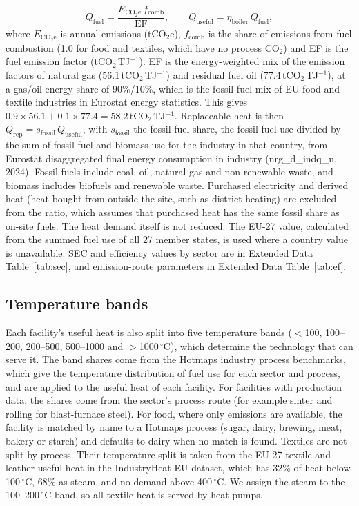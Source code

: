 \documentclass[11pt]{article}
\begin{document}
\begin{equation}
Q_{\mathrm{fuel}} = \frac{E_{\mathrm{CO_2e}}\, f_{\mathrm{comb}}}{\mathrm{EF}}, \qquad Q_{\mathrm{useful}} = \eta_{\mathrm{boiler}}\, Q_{\mathrm{fuel}},
\end{equation}
where $E_{\mathrm{CO_2e}}$ is annual emissions (tCO$_2$e), $f_{\mathrm{comb}}$ is the share of emissions from fuel combustion (1.0 for food and textiles, which have no process CO$_2$) and EF is the fuel emission factor (tCO$_2$\,TJ$^{-1}$). EF is the energy-weighted mix of the emission factors of natural gas (56.1\,tCO$_2$\,TJ$^{-1}$) and residual fuel oil (77.4\,tCO$_2$\,TJ$^{-1}$)\cite{ipcc2006stationary}, at a gas/oil energy share of 90\%/10\%, which is the fossil fuel mix of EU food and textile industries in Eurostat energy statistics\cite{eurostat_nrg_d_indq}. This gives $0.9\times56.1+0.1\times77.4=58.2$\,tCO$_2$\,TJ$^{-1}$. Replaceable heat is then $Q_{\mathrm{rep}} = s_{\mathrm{fossil}}\, Q_{\mathrm{useful}}$, with $s_{\mathrm{fossil}}$ the fossil-fuel share, the fossil fuel use divided by the sum of fossil fuel and biomass use for the industry in that country, from Eurostat disaggregated final energy consumption in industry (nrg\_d\_indq\_n, 2024)\cite{eurostat_nrg_d_indq_n}. Fossil fuels include coal, oil, natural gas and non-renewable waste, and biomass includes biofuels and renewable waste. Purchased electricity and derived heat (heat bought from outside the site, such as district heating) are excluded from the ratio, which assumes that purchased heat has the same fossil share as on-site fuels. The heat demand itself is not reduced. The EU-27 value, calculated from the summed fuel use of all 27 member states, is used where a country value is unavailable. SEC and efficiency values by sector are in Extended Data Table~\ref{tab:sec}, and emission-route parameters in Extended Data Table~\ref{tab:ef}.

\subsection*{Temperature bands}
Each facility's useful heat is also split into five temperature bands ($<$100, 100--200, 200--500, 500--1000 and $>$1000\,$^\circ$C), which determine the technology that can serve it. The band shares come from the Hotmaps industry process benchmarks\cite{hotmaps2018}, which give the temperature distribution of fuel use for each sector and process, and are applied to the useful heat of each facility. For facilities with production data, the shares come from the sector's process route (for example sinter and rolling for blast-furnace steel). For food, where only emissions are available, the facility is matched by name to a Hotmaps process (sugar, dairy, brewing, meat, bakery or starch) and defaults to dairy when no match is found. Textiles are not split by process. Their temperature split is taken from the EU-27 textile and leather useful heat in the IndustryHeat-EU dataset\cite{madeddu2020}, which has 32\% of heat below 100\,$^\circ$C, 68\% as steam, and no demand above 400\,$^\circ$C. We assign the steam to the 100--200\,$^\circ$C band, so all textile heat is served by heat pumps.
\end{document}
